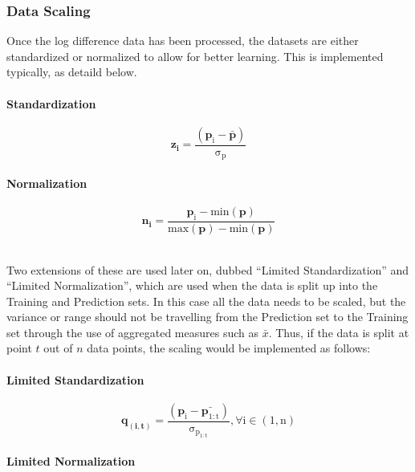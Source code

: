 \documentclass[a4paper,11pt,oneside]{article}
\theoremstyle{plain}
\theoremstyle{definition}
\begin{document}
\subsubsection{Data Scaling}\label{data_scaling}
Once the log difference data has been processed, the datasets are either standardized or normalized to allow for better learning. This is implemented typically, as detaild below.

\paragraph{Standardization}
\begin{equation}
\mathbf{z_i}= \mathrm{\frac{(\mathbf{p}_i - \mathbf{\bar{p}}) }{\sigma_p}}
\end{equation}

\paragraph{Normalization}

\begin{equation}\label{eq_ltd_normalization}
\mathbf{n_i}= \frac{\mathrm{\mathbf{p}_i - min(\mathbf{p}) }}{\mathrm{max(\mathbf{p}) -{min}(\mathbf{p})}}
\end{equation}

~\\
Two extensions of these are used later on, dubbed ``Limited Standardization'' and ``Limited Normalization'', which are used when the data is split up into the Training and Prediction sets. In this case all the data needs to be scaled, but the variance or range should not be travelling from the Prediction set to the Training set through the use of aggregated measures such as $\bar{x}$. Thus, if the data is split at point $t$ out of $n$ data points, the scaling would be implemented as follows:

\paragraph{Limited Standardization}

\begin{equation}
\mathbf{q_{(i, t)}} =\mathrm{ \frac{(\mathbf{p}_i - \bar{\mathbf{p}_{1:t}}) }{\sigma_{p_{1:t}}} , \forall  i \in (1, n)}
\end{equation}

\paragraph{Limited Normalization}
\end{document}
